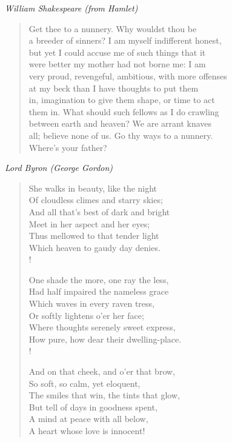 \documentclass[10pt]{memoir}
\newcommand{\poemauthor}[1]{{\small\itshape #1}\par\medskip}
\begin{document}
\clearpage

\poemauthor{William Shakespeare (from \textit{Hamlet})}

\begin{verse}
Get thee to a nunnery. Why wouldst thou be\\
a breeder of sinners? I am myself indifferent honest,\\
but yet I could accuse me of such things that it\\
were better my mother had not borne me: I am\\
very proud, revengeful, ambitious, with more offenses\\
at my beck than I have thoughts to put them\\
in, imagination to give them shape, or time to act\\
them in. What should such fellows as I do crawling\\
between earth and heaven? We are arrant knaves\\
all; believe none of us. Go thy ways to a nunnery.\\
Where's your father?
\end{verse}

\poemauthor{Lord Byron (George Gordon)}

\begin{verse}
She walks in beauty, like the night\\
Of cloudless climes and starry skies;\\
And all that's best of dark and bright\\
Meet in her aspect and her eyes;\\
Thus mellowed to that tender light\\
Which heaven to gaudy day denies.\\!

One shade the more, one ray the less,\\
Had half impaired the nameless grace\\
Which waves in every raven tress,\\
Or softly lightens o'er her face;\\
Where thoughts serenely sweet express,\\
How pure, how dear their dwelling-place.\\!

And on that cheek, and o'er that brow,\\
So soft, so calm, yet eloquent,\\
The smiles that win, the tints that glow,\\
But tell of days in goodness spent,\\
A mind at peace with all below,\\
A heart whose love is innocent!
\end{verse}
\end{document}
